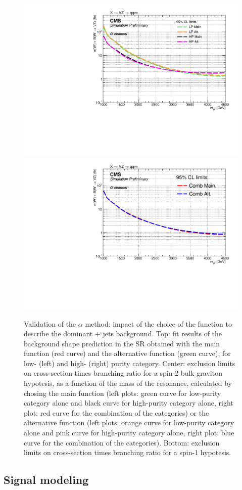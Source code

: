 \begin{figure}[!htb]
    \includegraphics[width=.495\textwidth]{BackgroundFunctionValidation/Exclusion_XWZInv_main_vs_alt_LPHP_test.pdf}
    \includegraphics[width=.495\textwidth]{BackgroundFunctionValidation/Exclusion_XWZInv_main_vs_alt_comb_test.pdf}

  \caption{Validation of the $\alpha$ method: impact of the choice of the function to describe the dominant \V + jets background. Top: fit results of the background shape prediction in the SR obtained with the main function (red curve) and the alternative function (green curve), for low- (left) and high- (right) purity category. Center: exclusion limits on cross-section times branching ratio for a spin-2 bulk graviton hypotesis, as a function of the mass of the resonance, calculated by chosing the main function (left plots: green curve for low-purity category alone and black curve for high-purity category alone, right plot: red curve for the combination of the categories) or the alternative function (left plots: orange curve for low-purity category alone and pink curve for high-purity category alone, right plot: blue curve for the combination of the categories). Bottom: exclusion limits on cross-section times branching ratio for a spin-1 \Wp hypotesis.}
  \label{fig:validation_mainalt}
\end{figure}

\clearpage

\subsection{Signal modeling}

